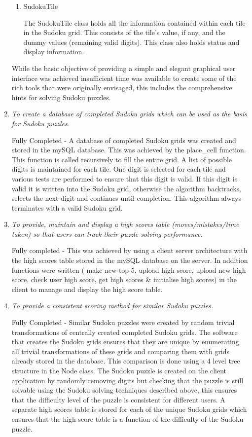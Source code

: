\documentclass[fleqn]{article}
\begin{document}
\begin{enumerate}
\begin{enumerate}
\item{SudokuTile}

The SudokuTile class holds all the information contained within each tile in the Sudoku grid. This consists of the tile’s value, if any, and the dummy values (remaining valid digits). This class also holds status and display information.
\end{enumerate}

While the basic objective of providing a simple and elegant graphical user interface was achieved insufficient time was available to create some of the rich tools that were originally envisaged, this includes the comprehensive hints for solving Sudoku puzzles.

\item{\textit{To create a database of completed Sudoku grids which can be used as the basis for Sudoku puzzles.}}

Fully Completed - A database of completed Sudoku grids was created and stored in the mySQL database. This was achieved by the place\_cell function. This function is called recursively to fill the entire grid. A list of possible digits is maintained for each tile. One digit is selected for each tile and various tests are performed to ensure that this digit is valid. If this digit is valid it is written into the Sudoku grid, otherwise the algorithm backtracks, selects the next digit and continues until completion. This algorithm always terminates with a valid Sudoku grid.

\item{\textit{To provide, maintain and display a high scores table (moves/mistakes/time taken) so that users can track their puzzle solving performance.}}

Fully completed - This was achieved by using a client server architecture with the high scores table stored in the mySQL database on the server. In addition functions were written ( make new top 5, upload high score, upload new high score, check user high score, get high scores \& initialise high scores) in the client to manage and display the high score table.

\item{\textit{To provide a consistent scoring method for similar Sudoku puzzles.}}

Fully Completed - Similar Sudoku puzzles were created by random trivial transformations of centrally created completed Sudoku grids. 
The software that creates the Sudoku grids ensures that they are unique by enumerating all trivial transformations of these grids and comparing them with grids already stored in the database. This comparison is done using a 4 level tree structure in the Node class. 
The Sudoku puzzle is created on the client application by randomly removing digits but checking that the puzzle is still solvable using the Sudoku solving techniques described above, this ensures that the difficulty level of the puzzle is consistent for different users.
A separate high scores table is stored for each of the unique Sudoku grids which ensures that the high score table is a function of the difficulty of the Sudoku puzzle.

\end{enumerate}
\end{document}

